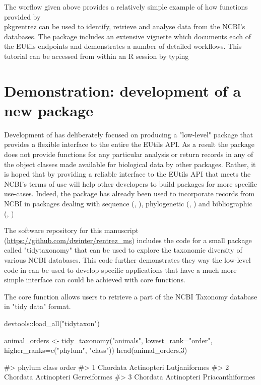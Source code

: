 The worflow given above provides a relatively simple example of how functions
provided by \\pkg{rentrez} can be used to identify, retrieve and analyse data
from the NCBI's databases. The package includes an extensive vignette which
documents each of the EUtils endpoints and demonstrates a number of detailed
workflows. This tutorial can be accessed from within an R session by typing 

\section{Demonstration: development of a new package}

Development of  has deliberately focused on producing a "low-level"
package that provides a flexible interface to the entire the EUtils API. As a 
result the package does not provide functions for any particular analysis
or return records in any of the object classes made available for biological
data by other packages. Rather, it is hoped that by providing a reliable interface
to the EUtils API that meets the NCBI's terms of use  will help 
other developers to build packages for more specific use-cases. Indeed, the
package has already been used to incorporate records from NCBI in packages dealing
with sequence (, \citealt{genbankr}), phylogenetic 
(, \citealt{rotl}) and bibliographic (,
\citealt{fulltext})

The software repository for this manuscript
(\url{https://github.com/dwinter/rentrez_ms}) includes the code for a small
package called "tidytaxonomy" that can be used to explore the taxonomic
diversity of various NCBI databases. This code further  demonstrates they way the 
low-level code in  can be used to develop specific applications 
that have a much more simple interface can could be achieved with core 
 functions.

The core function  allows users to retrieve a part of the NCBI 
Taxonomy database in "tidy data" \citep{tidy-data} format.

\begin{example}
devtools::load_all("tidytaxon")

animal_orders <- tidy_taxonomy("animals", 
                               lowest_rank="order",
                               higher_ranks=c("phylum", "class"))
head(animal_orders,3)

#>     phylum       class            order
#> 1 Chordata Actinopteri    Lutjaniformes
#> 2 Chordata Actinopteri     Gerreiformes
#> 3 Chordata Actinopteri Priacanthiformes
\end{example}

